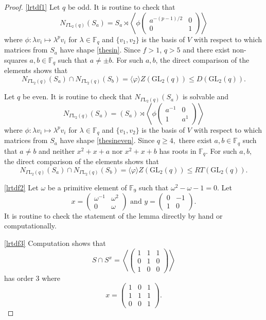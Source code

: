 \documentclass[a4paper,reqno,11pt]{amsart}
\theoremstyle{definition}
\theoremstyle{remark}
\numberwithin{equation}{section}
\newcommand{\GaL}{{\Gamma \mathrm{L}}}
\newcommand{\GL}{{\mathrm{GL}}}
\begin{document}
\begin{proof}
\ref{lrtdf1} Let $q$ be odd. It is routine to check that 
$$N_{\GaL_2(q)}(S_a) = S_a \rtimes \left\langle \phi \begin{pmatrix}
a^{-(p-1)/2}    & 0  \\
0    &  1       
\end{pmatrix} \right\rangle$$ 
where $\phi : \lambda v_i \mapsto \lambda^p v_i$ for $\lambda \in \mathbb{F}_q$ and $\{v_1, v_2\}$ is the basis of $V$ with respect to which matrices from $S_a$ have shape \eqref{thesin}. Since $f>1$, $q>5$ and there exist non-squares $a, b \in \mathbb{F}_q$ such that $a \ne \pm b$. For such $a,b$, the direct comparison of the elements shows that  
$$N_{\GaL_2(q)}(S_a) \cap N_{\GaL_2(q)}(S_b)=\langle \varphi \rangle Z(\GL_2(q)) \le D(\GL_2(q)).$$

\medskip

Let $q$ be even.  It is routine to check that  $N_{\GaL_2(q)}(S_a)$ is solvable and 
$$N_{\GaL_2(q)}(S_a)= (S_a) \rtimes \left\langle \phi \begin{pmatrix}
a^{-1}    & 0  \\
1    &  a^1       
\end{pmatrix} \right\rangle$$ 
where $\phi : \lambda v_i \mapsto \lambda^p v_i$ for $\lambda \in \mathbb{F}_q$ and $\{v_1, v_2\}$ is the basis of $V$ with respect  to which matrices from $S_a$ have shape \eqref{thesineven}. Since $q \ge 4,$ there exist $a, b \in \mathbb{F}_q$ such that $a \ne b$
and neither $x^2+x+a$ nor $x^2+x+b$ has roots in $\mathbb{F}_q$. 
For such $a,b$, the direct comparison of the elements shows that   $$N_{\GaL_2(q)}(S_a) \cap N_{\GaL_2(q)}(S_b)=\langle \varphi \rangle Z(\GL_2(q))\le RT(\GL_2(q)).$$

\medskip

\ref{lrtdf2}
Let $\omega$ be a primitive element of $\mathbb{F}_9$ such that $\omega^2-\omega-1=0.$ Let
$$x = \begin{pmatrix}
\omega^{-1} & \omega^2 \\
0 & \omega
\end{pmatrix} \text{ and } y=\begin{pmatrix}
0 & -1 \\
1 & 0
\end{pmatrix}.$$ It is routine to check the statement of the lemma directly by hand or computationally. 

\medskip

\ref{lrtdf3} 
Computation shows that 
$$ S\cap S^x = \left\langle
 \begin{pmatrix}
1    & 1 & 1  \\
0 &1    & 0  \\
  1&    0    &   0      
\end{pmatrix} 
\right\rangle $$
has order 3 where $$
x= \begin{pmatrix}
1    & 0 & 1  \\
1 &1    & 1  \\
  0&    0    &   1      
\end{pmatrix}. $$ 
\end{proof}
\end{document}
